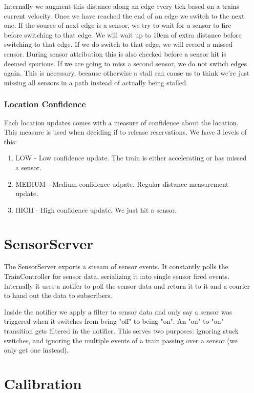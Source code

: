 \documentclass{article}
\begin{document}
Internally we augment this distance along an edge every tick based on a trains current velocity. Once we have reached the end of an edge we switch to the next one. If the source of next edge is a sensor, we try to wait for a sensor to fire before switching to that edge. We will wait up to 10cm of extra distance before switching to that edge. If we do switch to that edge, we will record a missed sensor. During sensor attribution this is also checked before a sensor hit is deemed spurious. If we are going to miss a second sensor, we do not switch edges again. This is necessary, because otherwise a stall can cause us to think we're just missing all sensors in a path instead of actually being stalled.

\subsubsection{Location Confidence}

Each location updates comes with a measure of confidence about the location. This measure is used when deciding if to release reservations. We have 3 levels of this:
\begin{enumerate}
  \item LOW - Low confidence update. The train is either accelerating or has missed a sensor.
  \item MEDIUM - Medium confidence udpate. Regular distance measurement update.
  \item HIGH - High confidence update. We just hit a sensor.
\end{enumerate}

\section{SensorServer}

The SensorServer exports a stream of sensor events. It constantly polls the TrainController for sensor data, serializing it into single sensor fired events. Internally it uses a notifer to poll the sensor data and return it to it and a courier to hand out the data to subscribers.

Inside the notifier we apply a filter to sensor data and only say a sensor was triggered when it switches from being "off" to being "on". An "on" to "on" transition gets filtered in the notifier. This serves two purposes: ignoring stuck switches, and ignoring the multiple events of a train passing over a sensor (we only get one instead).

\section{Calibration}
\end{document}
